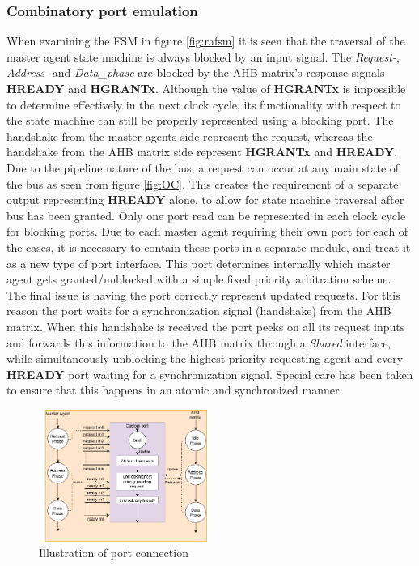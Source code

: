 \subsubsection{Combinatory port emulation}
When examining the FSM in figure \ref{fig:rafsm} it is seen that the traversal of the master agent state machine is always blocked by an input signal. The \textit{Request-}, \textit{Address-} and \textit{Data\_phase} are blocked by the AHB matrix's response signals \textbf{HREADY} and \textbf{HGRANTx}. Although the value of \textbf{HGRANTx} is impossible to determine effectively in the next clock cycle, its functionality with respect to the state machine can still be properly represented using a blocking port. The handshake from the master agents side represent the request, whereas the handshake from the AHB matrix side represent \textbf{HGRANTx} and \textbf{HREADY}. 
Due to the pipeline nature of the bus, a request can occur at any main state of the bus as seen from figure \ref{fig:OC}. This creates the requirement of a separate output representing \textbf{HREADY} alone, to allow for state machine traversal after bus has been granted. Only one port read can be represented in each clock cycle for blocking ports. Due to each master agent requiring their own port for each of the cases, it is necessary to contain these ports in a separate module, and treat it as a new type of port interface.
This port determines internally which master agent gets granted/unblocked with a simple fixed priority arbitration scheme. The final issue is having the port correctly represent updated requests. For this reason the port waits for a synchronization signal (handshake) from the AHB matrix. When this handshake is received the port peeks on all its request inputs and forwards this information to the AHB matrix through a \textit{Shared} interface, while simultaneously unblocking the highest priority requesting agent and every \textbf{HREADY} port waiting for a synchronization signal. Special care has been taken to ensure that this happens in an atomic and synchronized manner.   
\begin{figure}
\includegraphics[width=5.5cm]{figs/ESL/port_diagram.png}
\caption{Illustration of port connection}\label{fig:cport}
\end{figure}

